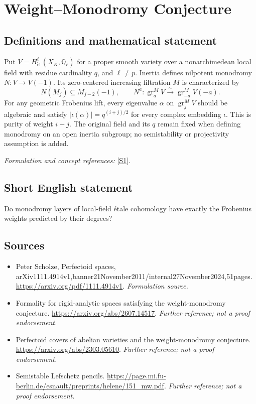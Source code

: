 \documentclass[11pt]{article}
\begin{document}
\section*{\texorpdfstring{Weight–Monodromy Conjecture}{Weight–Monodromy Conjecture}}\label{85}
\subsection{Definitions and mathematical statement}
Put $V=H^i_{\mathrm{\acute et}}(X_{\bar K},\overline{\mathbb{Q}}_\ell)$ for a proper smooth variety over a nonarchimedean local field with residue cardinality $q$, and $\ell\ne p$. Inertia defines nilpotent monodromy $N:V\to V(-1)$. Its zero-centered increasing filtration $M$ is characterized by
\[
 N(M_j)\subseteq M_{j-2}(-1),\qquad
 N^a:\operatorname{gr}^M_aV\xrightarrow{\sim}\operatorname{gr}^M_{-a}V(-a).
\]
For any geometric Frobenius lift, every eigenvalue $\alpha$ on $\operatorname{gr}^M_jV$ should be algebraic and satisfy $|\iota(\alpha)|=q^{(i+j)/2}$ for every complex embedding $\iota$. This is purity of weight $i+j$. The original field and its $q$ remain fixed when defining monodromy on an open inertia subgroup; no semistability or projectivity assumption is added.
\par\smallskip\textit{Formulation and concept references:} \href{https://arxiv.org/pdf/1111.4914v1}{[S1]}.

\subsection{Short English statement}
Do monodromy layers of local-field étale cohomology have exactly the Frobenius weights predicted by their degrees?
\subsection{Sources}
\begin{itemize}
\item[S1]Peter Scholze, Perfectoid spaces, arXiv1111.4914v1,banner21November2011/internal27November2024,51pages.
\url{https://arxiv.org/pdf/1111.4914v1}.
\textit{Formulation source.}
\item[S2]Formality for rigid-analytic spaces satisfying the weight-monodromy conjecture.
\url{https://arxiv.org/abs/2607.14517}.
\textit{Further reference; not a proof endorsement.}
\item[S3]Perfectoid covers of abelian varieties and the weight-monodromy conjecture.
\url{https://arxiv.org/abs/2303.05610}.
\textit{Further reference; not a proof endorsement.}
\item[S4]Semistable Lefschetz pencils.
\url{https://page.mi.fu-berlin.de/esnault/preprints/helene/151_mw.pdf}.
\textit{Further reference; not a proof endorsement.}
\end{itemize}
\end{document}
